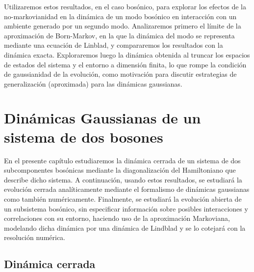 \documentclass{report} %
\numberwithin{equation}{section}
\begin{document}
Utilizaremos estos resultados, en el caso bosónico, para explorar los efectos de la no-markovianidad en la dinámica de un modo bosónico en interacción con un ambiente generado por un segundo modo. Analizaremos primero el límite de la aproximación de Born-Markov, en la que la dinámica del modo se representa mediante una ecuación de Linblad, y compararemos los resultados con la dinámica exacta. Exploraremos luego la dinámica obtenida al truncar los espacios de estados del sistema y el entorno a dimensión finita, lo que rompe la condición de gaussianidad de la evolución, como motivación para discutir estrategias de generalización (aproximada) para las dinámicas gaussianas. 



\chapter{Din\'amicas Gaussianas de un sistema de dos bosones}\label{cap3_dosbosones}

En el presente capítulo estudiaremos la dinámica cerrada de un sistema de dos subcomponentes bosónicas mediante la diagonalización del Hamiltoniano que describe dicho sistema. A continuación, usando estos resultados, se estudiará la evolución cerrada analíticamente mediante el formalismo de dinámicas gaussianas como también numéricamente. Finalmente, se estudiará la evolución abierta de un subsistema bosónico, sin especificar información sobre posibles interacciones y correlaciones con su entorno, haciendo uso de la aproximación Markoviana, modelando dicha dinámica por una dinámica de Lindblad y se lo cotejará con la resolución numérica.


\section{Din\'amica cerrada}
\end{document}
